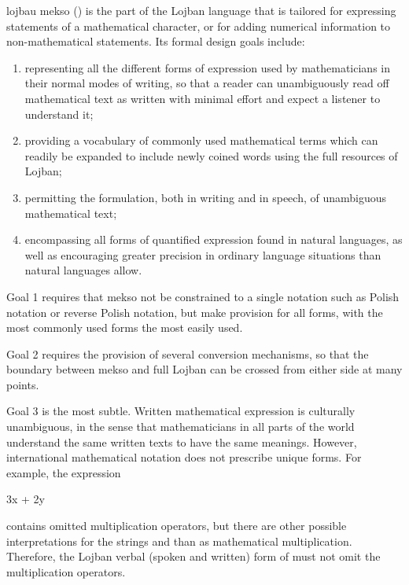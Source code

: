 lojbau mekso () is the part
    of the Lojban language that is tailored for expressing
    statements of a mathematical character, or for adding numerical
    information to non-mathematical statements. Its formal design
    goals include: 
\begin{enumerate}
\item representing all the different forms of expression used by mathematicians in their normal modes of writing, so that a reader can unambiguously read off mathematical text as written with minimal effort and expect a listener to understand it;
\item providing a vocabulary of commonly used mathematical terms which can readily be expanded to include newly coined words using the full resources of Lojban;
\item permitting the formulation, both in writing and in speech, of unambiguous mathematical text;
\item encompassing all forms of quantified expression found in natural languages, as well as encouraging greater precision in ordinary language situations than natural languages allow.
\end{enumerate}

Goal 1 requires that mekso not be constrained to a single
    notation such as Polish notation or reverse Polish notation,
    but make provision for all forms, with the most commonly used
    forms the most easily used. 

Goal 2 requires the provision of several conversion
    mechanisms, so that the boundary between mekso and full Lojban
    can be crossed from either side at many points.

Goal 3 is the most subtle. Written mathematical expression
    is culturally unambiguous, in the sense that mathematicians in
    all parts of the world understand the same written texts to
    have the same meanings. However, international mathematical
    notation does not prescribe unique forms. For example, the
    expression
\begin{example}
3x + 2y
\end{example}

{\noindent}contains omitted multiplication operators, but there are other
    possible interpretations for the strings  and  than
    as mathematical multiplication. Therefore, the Lojban verbal
    (spoken and written) form of 
    must not omit the multiplication operators. 

